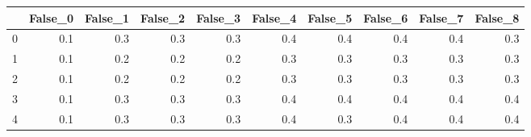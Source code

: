 \begin{tabular}{lrrrrrrrrr}
\toprule
{} &  False\_0 &  False\_1 &  False\_2 &  False\_3 &  False\_4 &  False\_5 &  False\_6 &  False\_7 &  False\_8 \\ \hline
\midrule
0 &      0.1 &      0.3 &      0.3 &      0.3 &      0.4 &      0.4 &      0.4 &      0.4 &      0.3 \\ \hline
1 &      0.1 &      0.2 &      0.2 &      0.2 &      0.3 &      0.3 &      0.3 &      0.3 &      0.3 \\ \hline
2 &      0.1 &      0.2 &      0.2 &      0.2 &      0.3 &      0.3 &      0.3 &      0.3 &      0.3 \\ \hline
3 &      0.1 &      0.3 &      0.3 &      0.3 &      0.4 &      0.4 &      0.4 &      0.4 &      0.4 \\ \hline
4 &      0.1 &      0.3 &      0.3 &      0.3 &      0.4 &      0.3 &      0.4 &      0.4 &      0.4 \\ \hline
\bottomrule
\end{tabular}

